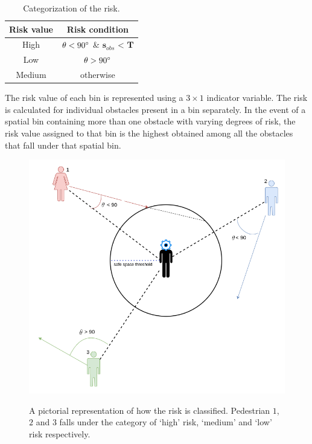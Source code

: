 \begin{table}[htbp]
    \begin{center}
        \renewcommand{\arraystretch}{1.3}
        \begin{tabular}{|c|c|}
            \hline
            \textbf{Risk value}& \textbf{Risk condition} \\
            \hline
            High & $\theta < 90\degree$ \&  $\mathbf{s}_{obs}$ < $\mathbf{T}$   \\
            
            Low & $\theta > 90\degree$\\
            
            Medium & otherwise \\
            \hline
        \end{tabular}
    	 \caption{Categorization of the risk.}
		\label{risk-categorization-table}
    \end{center}

\end{table}
\par
The risk value of each bin is represented using a $3 \times 1$ indicator variable. The risk is calculated for individual obstacles present in a bin separately. In the event of a spatial bin containing more than one obstacle with varying degrees of risk, the risk value assigned to that bin is the highest obtained among all the obstacles that fall under that spatial bin.
\begin{figure}[!htbp]
	\centering
	\includegraphics[width=.8\linewidth]{figures/risk_picture.png}
    \label{fig:risk-calculation}
    \caption{A pictorial representation of how the risk is classified. Pedestrian $1$, $2$ and $3$ falls under the category of `high' risk, `medium' and `low' risk respectively.}
\end{figure}


